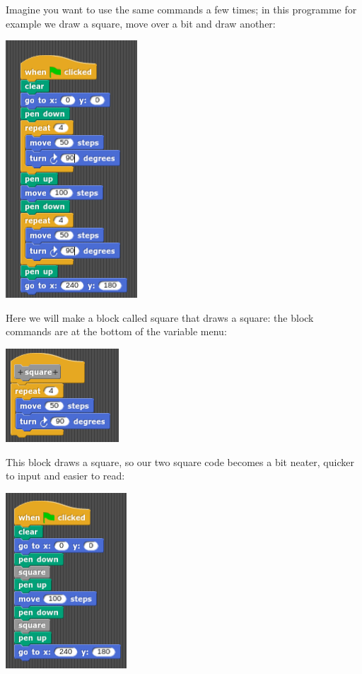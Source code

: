 \documentclass[11pt,a4paper]{scrartcl}
\begin{document}
Imagine you want to use the same commands a few times; in this
programme for example we draw a square, move over a bit and draw
another:
\begin{center}
\includegraphics{two_squares.png}
\end{center}
Here we will make a block called square that draws a square: the block
commands are at the bottom of the variable menu:
\begin{center}
\includegraphics{two_squares_block_block.png}
\end{center}
This block draws a square, so our two square code becomes a bit
neater, quicker to input and easier to read:
\begin{center}
\includegraphics{two_squares_block.png}
\end{center}
\end{document}
